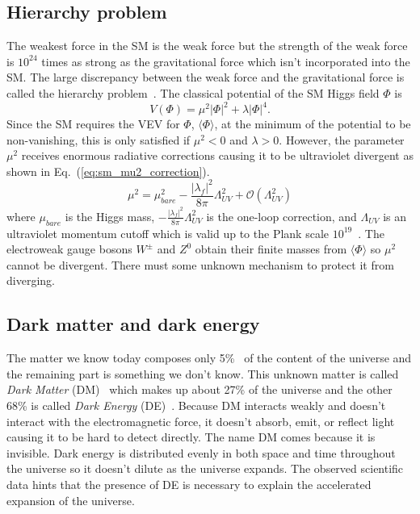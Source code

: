 \subsection{Hierarchy problem}
\label{subsec:sm_hierarchy_problem}
The weakest force in the SM is the weak force but the strength of the weak force is $10^{24}$ times as strong as the gravitational force which isn't incorporated into the SM.
The large discrepancy between the weak force and the gravitational force is called the hierarchy problem~\cite{Martin:1997ns, Chankowski:1998za, maarten_brak}.
The classical potential of the SM Higgs field $\Phi$ is
%
\begin{equation}
    V(\Phi) = \mu^{2} |\Phi|^2 + \lambda |\Phi|^4.
\end{equation}
%
Since the SM requires the VEV for $\Phi$, $\langle \Phi \rangle$, at the minimum of the potential to be non-vanishing, this is only satisfied if $\mu^{2} < 0$ and $\lambda > 0$.
However, the parameter $\mu^{2}$ receives enormous radiative corrections causing it to be ultraviolet divergent as shown in Eq.~(\ref{eq:sm_mu2_correction}).
%
\begin{equation}
    \mu^{2} = \mu_{bare}^{2} - \frac{|\lambda_{f}|^{2}}{8\pi}\Lambda_{UV}^{2} + \mathcal{O}(\Lambda_{UV}^{2})
    \label{eq:sm_mu2_correction}
\end{equation}
%
where $\mu_{bare}$ is the Higgs mass, $- \frac{|\lambda_{f}|^{2}}{8\pi}\Lambda_{UV}^{2}$ is the one-loop correction, and $\Lambda_{UV}$ is an ultraviolet momentum cutoff which is valid up to the Plank scale $10^{19}$~{\GeV}.
The electroweak gauge bosons $W^{\pm}$ and $Z^{0}$ obtain their finite masses from $\langle \Phi \rangle$ so $\mu^{2}$ cannot be divergent.
There must some unknown mechanism to protect it from diverging.


\subsection{Dark matter and dark energy}
\label{subsec:sm_dm}
The matter we know today composes only 5\%~\cite{Bennett:2012zja, Ade:2013sjv} of the content of the universe and the remaining part is something we don't know.
This unknown matter is called \textit{Dark Matter} (DM)~\cite{Bertone:2004pz} which makes up about 27\% of the universe and the other 68\% is called \textit{Dark Energy} (DE)~\cite{Bennett:2012zja, Ade:2013sjv}.
Because DM interacts weakly and doesn't interact with the electromagnetic force, it doesn't absorb, emit, or reflect light causing it to be hard to detect directly. 
The name DM comes because it is invisible.
Dark energy is distributed evenly in both space and time throughout the universe so it doesn't dilute as the universe expands.
The observed scientific data hints that the presence of DE is necessary to explain the accelerated expansion of the universe.

